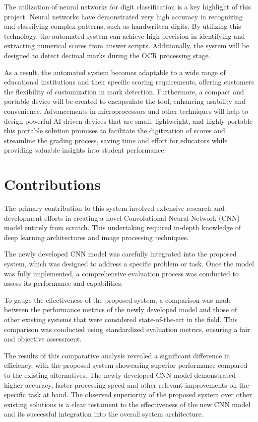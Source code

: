 \noindent The utilization of neural networks for digit classification is a key highlight of this project. Neural networks have demonstrated very high accuracy in recognizing and classifying complex patterns, such as handwritten digits. By utilizing this technology, the automated system can achieve high precision in identifying and extracting numerical scores from answer scripts. Additionally, the system will be designed to detect decimal marks during the OCR processing stage.

\clearpage

\noindent As a result, the automated system becomes adaptable to a wide range of educational institutions and their specific scoring requirements, offering customers the flexibility of customization in mark detection. Furthermore, a compact and portable device will be created to encapsulate the tool, enhancing usability and convenience. Advancements in microprocessors and other techniques will help to design powerful AI-driven devices that are small, lightweight, and highly portable this portable solution promises to facilitate the digitization of scores and streamline the grading process, saving time and effort for educators while providing valuable insights into student performance.

\section{Contributions}

\noindent The primary contribution to this system involved extensive research and development efforts in creating a novel Convolutional Neural Network (CNN) model entirely from scratch. This undertaking required in-depth knowledge of deep learning architectures and image processing techniques.

\noindent The newly developed CNN model was carefully integrated into the proposed system, which was designed to address a specific problem or task. Once the model was fully implemented, a comprehensive evaluation process was conducted to assess its performance and capabilities.

\noindent To gauge the effectiveness of the proposed system, a comparison was made between the performance metrics of the newly developed model and those of other existing systems that were considered state-of-the-art in the field. This comparison was conducted using standardized evaluation metrics, ensuring a fair and objective assessment.

\noindent The results of this comparative analysis revealed a significant difference in efficiency, with the proposed system showcasing superior performance compared to the existing alternatives. The newly developed CNN model demonstrated higher accuracy, faster processing speed and other relevant improvements on the specific task at hand. The observed superiority of the proposed system over other existing solutions is a clear testament to the effectiveness of the new CNN model and its successful integration into the overall system architecture.